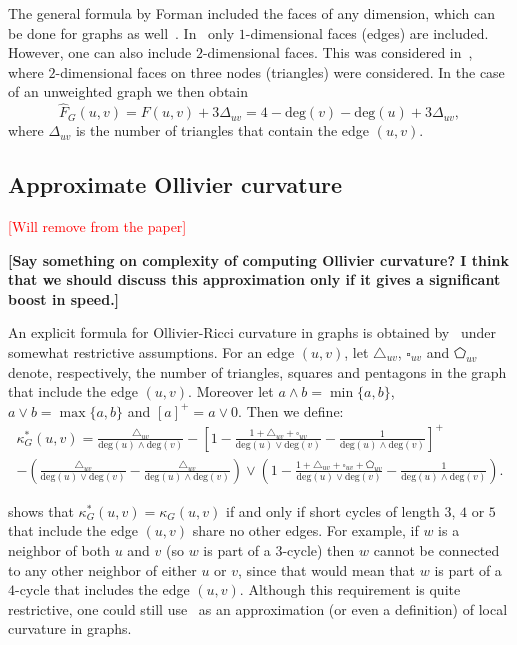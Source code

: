 \documentclass{article} %
\begin{document}
The general formula by Forman included the faces of any dimension, which can be done for graphs as well~\citep{weber2017coarse}. In~ only $1$-dimensional faces (edges) are included. However, one can also include $2$-dimensional faces. This was considered in~\cite{samal2018comparative}, where $2$-dimensional faces on three nodes (triangles) were considered. In the case of an unweighted graph we then obtain
\begin{equation}\label{eq:def_forman_curvature_triangles}
	\hat F_G(u,v) = F(u,v) + 3\Delta_{uv} 
	= 4 - \mathrm{deg}(v) - \mathrm{deg}(u) + 3\Delta_{uv},
\end{equation}
where $\Delta_{uv}$ is the number of triangles that contain the edge $(u,v)$. 

\subsection{Approximate Ollivier curvature}

\textcolor{red}{[Will remove from the paper]}

\textbf{[Say something on complexity of computing Ollivier curvature? I think that we should discuss this approximation only if it gives a significant boost in speed.]}

An explicit formula for Ollivier-Ricci curvature in graphs is obtained by~\citet{kelly2019self} under somewhat restrictive assumptions. 
For an edge $(u,v)$, let $\triangle_{uv}$, $\square_{uv}$ and $\pentagon_{uv}$ denote, respectively, the number of triangles, squares and pentagons in the graph that include the edge $(u,v)$. Moreover let $a \wedge b = \min\{a,b\}$, $a \vee b = \max\{a,b\}$ and $[a]^+ = a \vee 0$. Then we define:
\begin{multline}\label{eq:def_ollivier_ricci_approx}
		\kappa_G^\ast(u,v) = \frac{\triangle_{uv}}{\mathrm{deg}(u) \wedge \mathrm{deg}(v)} 
			- \left[1 - \frac{1 + \triangle_{uv} + \square_{uv}}{\mathrm{deg}(u) \vee \mathrm{deg}(v)} - \frac{1}{\mathrm{deg}(u) \wedge \mathrm{deg}(v)}\right]^+\\
	- \left(\frac{\triangle_{uv}}{\mathrm{deg}(u) \vee \mathrm{deg}(v)} 
			- \frac{\triangle_{uv}}{\mathrm{deg}(u) \wedge \mathrm{deg}(v)}\right) \vee \left(1 - \frac{1 + \triangle_{uv} + \square_{uv} + \pentagon_{uv}}
			{\mathrm{deg}(u) \vee \mathrm{deg}(v)}
			- \frac{1}{\mathrm{deg}(u) \wedge \mathrm{deg}(v)}\right).
\end{multline}

\citet{kelly2019self} shows that $\kappa_G^\ast(u,v) = \kappa_G(u,v)$ if and only if short cycles of length $3$, $4$ or $5$ that include the edge $(u,v)$ share no other edges. For example, if $w$ is a neighbor of both $u$ and $v$ (so $w$ is part of a $3$-cycle) then $w$ cannot be connected to any other neighbor of either $u$ or $v$, since that would mean that $w$ is part of a $4$-cycle that includes the edge $(u,v)$. Although this requirement is quite restrictive, one could still use~ as an approximation (or even a definition) of local curvature in graphs.
\end{document}
